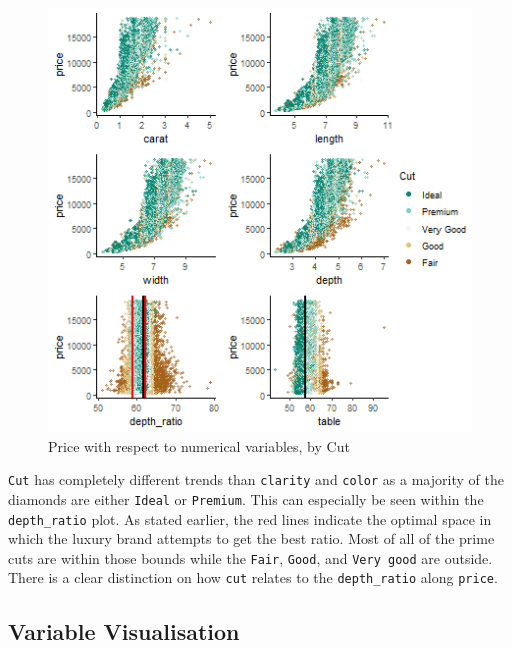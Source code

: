\documentclass[
  paper=a4,
  ,captions=tableheading
]{scrartcl}
\begin{document}
\begin{figure}[H]

{\centering \includegraphics[width=\linewidth,]{Diamonds_PDF_files/figure-latex/Price by X and Cut-1}

}

\caption{Price with respect to numerical variables, by Cut}\label{fig:Price by X and Cut}
\end{figure}

\texttt{Cut} has completely different trends than \texttt{clarity} and
\texttt{color} as a majority of the diamonds are either \texttt{Ideal}
or \texttt{Premium}. This can especially be seen within the
\texttt{depth\_ratio} plot. As stated earlier, the red lines indicate
the optimal space in which the luxury brand attempts to get the best
ratio. Most of all of the prime cuts are within those bounds while the
\texttt{Fair}, \texttt{Good}, and \texttt{Very\ good} are outside. There
is a clear distinction on how \texttt{cut} relates to the
\texttt{depth\_ratio} along \texttt{price}.

\hypertarget{variable-visualisation}{%
\subsection{Variable Visualisation}\label{variable-visualisation}}
\end{document}
